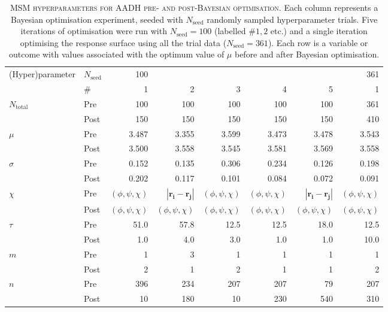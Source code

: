 \begin{table}
    \centering

    \begin{tabular}{llrrrrrr}
    \toprule
    (Hyper)parameter &$N_{\mathrm{seed}}$ & 100 & & & & &361\\
    &\#&1&2&3&4&5&1\\
    \midrule
    $N_{\mathrm{total}}$&Pre&100&100&100&100&100&361\\
    &Post&150&150&150&150&150&410\\
    \midrule
    $\mu$&Pre&3.487&3.355&3.599&3.473&3.478&3.543\\
    &Post&3.500&3.558&3.545&3.581&3.569&3.558\\
    \midrule
    $\sigma$&Pre&0.152&0.135&0.306&0.234&0.126&0.198\\
    &Post&0.202&0.117&0.101&0.084&0.072&0.091\\
    \midrule
    $\chi$&Pre&$(\phi,\psi,\chi)$&$|\mathbf{r_{i}}-\mathbf{r_{j}}|$&$(\phi,\psi,\chi)$&$(\phi,\psi,\chi)$&$|\mathbf{r_{i}}-\mathbf{r_{j}}|$&$(\phi,\psi,\chi)$\\
    &Post&$(\phi,\psi,\chi)$&$(\phi,\psi,\chi)$&$(\phi,\psi,\chi)$&$(\phi,\psi,\chi)$&$(\phi,\psi,\chi)$&$(\phi,\psi,\chi)$\\
    \midrule
    $\tau$&Pre&51.0&57.8&12.5&12.5&18.0&12.5\\
    &Post&1.0&4.0&3.0&1.0&1.0&10.0\\
    \midrule
    $m$&Pre&1&3&1&1&1&1\\
    &Post&2&1&2&1&1&2\\
    \midrule
    $n$&Pre&396&234&207&207&79&207\\
    &Post&10&180&10&230&540&310\\
    \bottomrule
    \end{tabular}
    \caption[MSM hyperparameters for AADH pre- and post-Bayesian optimisation]{\textsc{MSM hyperparameters for AADH pre- and post-Bayesian optimisation}. Each column represents a Bayesian optimisation experiment, seeded with $N_{\mathrm{seed}}$ randomly sampled hyperparameter trials. Five iterations of optimisation were run with $N_{\mathrm{seed}}=100$ (labelled $\# 1, 2$ etc.) and a single iteration optimising the response surface using all the trial data ($N_{\mathrm{seed}}=361$). Each row is a variable or outcome with values associated with the optimum value of $\mu$ before and after Bayesian optimisation.}
    \label{tab:aadh_opt_results}
\end{table}

